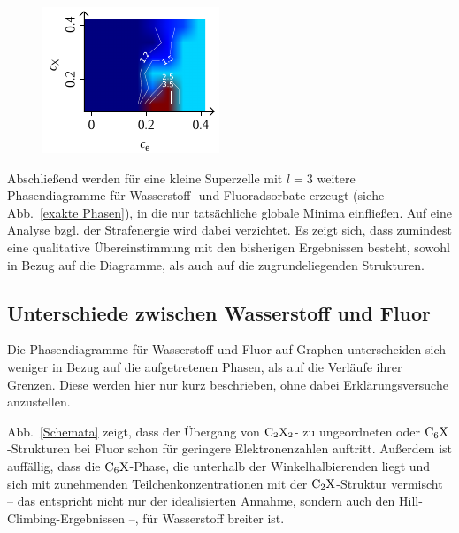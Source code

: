 \documentclass[a4paper, 10pt, twoside, openany]{book} %
\begin{document}
\begin{figure}[b]
\begin{minipage}[t]{0.31\textwidth}
    \end{minipage}
    \hfill
    \begin{minipage}[t]{0.31\textwidth}
        \includegraphics[width=\textwidth]{Abbildungen/Phasendiagramme/Exakt/F_D.pdf}
        \label{FDx}
    \end{minipage}
\end{figure}
%
Abschließend werden für eine kleine Superzelle mit $l = 3$ weitere Phasendiagramme für Wasserstoff- und Fluoradsorbate erzeugt (siehe Abb.~\ref{exakte Phasen}), in die nur tatsächliche globale Minima einfließen. Auf eine Analyse bzgl. der Strafenergie wird dabei verzichtet. Es zeigt sich, dass zumindest eine qualitative Übereinstimmung mit den bisherigen Ergebnissen besteht, sowohl in Bezug auf die Diagramme, als auch auf die zugrundeliegenden Strukturen.

\subsection{Unterschiede zwischen Wasserstoff und Fluor}

Die Phasendiagramme für Wasserstoff und Fluor auf Graphen unterscheiden sich weniger in Bezug auf die aufgetretenen Phasen, als auf die Verläufe ihrer Grenzen. Diese werden hier nur kurz beschrieben, ohne dabei Erklärungsversuche anzustellen.

Abb.~\ref{Schemata} zeigt, dass der Übergang von $\rm C_2X_2$- zu ungeordneten oder $\rm C_6X$-Strukturen bei Fluor schon für geringere Elektronenzahlen auftritt. Außerdem ist auffällig, dass die $\rm C_6X$-Phase, die unterhalb der Winkelhalbierenden liegt und sich mit zunehmenden Teilchenkonzentrationen mit der $\rm C_2X$-Struktur vermischt -- das entspricht nicht nur der idealisierten Annahme, sondern auch den Hill-Climbing-Ergebnissen --, für Wasserstoff breiter ist.
\end{document}
